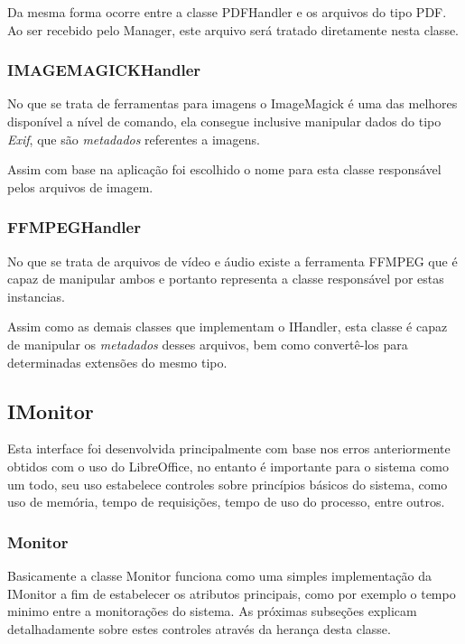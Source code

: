 Da mesma forma ocorre entre a classe PDFHandler e os arquivos do tipo PDF. Ao ser recebido pelo Manager, este arquivo será tratado diretamente nesta classe.

\subsubsection{IMAGEMAGICKHandler}

No que se trata de ferramentas para imagens o ImageMagick é uma das melhores disponível a nível de comando, ela consegue inclusive manipular dados do tipo \textit{Exif}, que são \textit{metadados} referentes a imagens.

Assim com base na aplicação foi escolhido o nome para esta classe responsável pelos arquivos de imagem.

\subsubsection{FFMPEGHandler}

No que se trata de arquivos de vídeo e áudio existe a ferramenta FFMPEG que é capaz de manipular ambos e portanto representa a classe responsável por estas instancias.

Assim como as demais classes que implementam o IHandler, esta classe é capaz de manipular os \textit{metadados} desses arquivos, bem como convertê-los para determinadas extensões do mesmo tipo.

\subsection{IMonitor}

Esta interface foi desenvolvida principalmente com base nos erros anteriormente obtidos com o uso do LibreOffice, no entanto é importante para o sistema como um todo, seu uso estabelece controles sobre princípios básicos do sistema, como uso de memória, tempo de requisições, tempo de uso do processo, entre outros.

\subsubsection{Monitor}
Basicamente a classe Monitor funciona como uma simples implementação da IMonitor a fim de estabelecer os atributos principais, como por exemplo o tempo minimo entre a monitorações do sistema. As próximas subseções explicam detalhadamente sobre estes controles através da herança desta classe.

